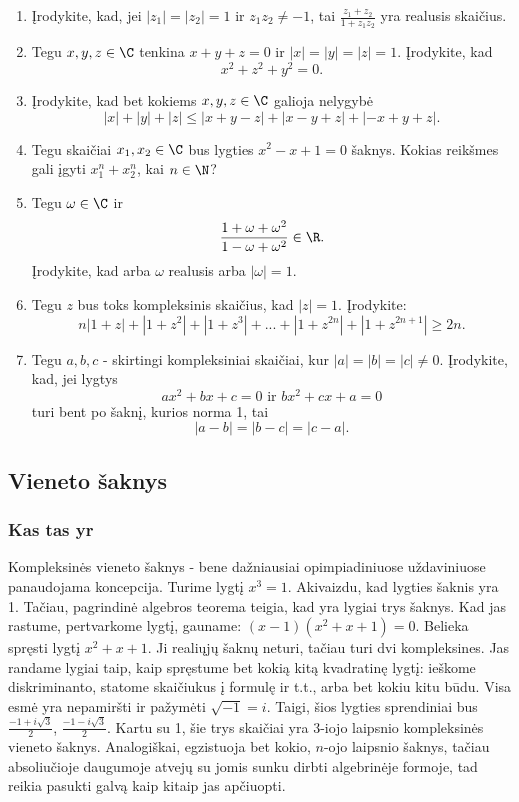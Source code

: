 \begin{enumerate}
\item Įrodykite, kad, jei $|z_1|=|z_2|=1$ ir $z_1z_2\neq -1$, tai $\frac{z_1+z_2}{1+z_1z_2}$ yra realusis skaičius.  
\item Tegu $x,y,z\in\C$ tenkina $x+y+z=0$ ir $|x|=|y|=|z|=1$. Įrodykite, kad $$x^2+z^2+y^2=0.$$
\item Įrodykite, kad bet kokiems $x,y,z\in\C$ galioja nelygybė $$|x|+|y|+|z|\leq |x+y-z|+|x-y+z|+|-x+y+z|.$$
\item Tegu skaičiai $x_1,x_2\in\C$ bus lygties $x^2-x+1=0$ šaknys. Kokias reikšmes gali įgyti $x_1^n+x_2^n$, kai $n\in\N$?
\item Tegu $\omega\in\C$ ir $$\frac{1+\omega+\omega^2}{1-\omega+\omega^2}\in\R.$$ Įrodykite, kad arba $\omega $ realusis arba $|\omega|=1.$
\item Tegu $z$ bus toks kompleksinis skaičius, kad $|z|=1$. Įrodykite: $$n|1+z|+|1+z^2|+|1+z^3|+...+|1+z^{2n}|+|1+z^{2n+1}|\geq 2n.$$
\item Tegu $a,b,c$ - skirtingi kompleksiniai skaičiai, kur $|a|=|b|=|c|\neq 0$. Įrodykite, kad, jei lygtys $$ax^2+bx+c=0 \text{ ir } bx^2+cx+a=0$$ turi bent po šaknį, kurios norma 1, tai $$|a-b|=|b-c|=|c-a|.$$
\end{enumerate}    

\subsection{Vieneto šaknys}

\subsubsection{Kas tas yr}

Kompleksinės vieneto šaknys - bene dažniausiai opimpiadiniuose uždaviniuose panaudojama koncepcija. Turime lygtį $x^3=1$. Akivaizdu, kad lygties šaknis yra 1. Tačiau, pagrindinė algebros teorema teigia, kad yra lygiai trys šaknys. Kad jas rastume, pertvarkome lygtį, gauname: $(x-1)(x^2+x+1)=0$. Belieka spręsti lygtį $x^2+x+1$. Ji realiųjų šaknų neturi, tačiau turi dvi kompleksines. Jas randame lygiai taip, kaip spręstume bet kokią kitą kvadratinę lygtį: ieškome diskriminanto, statome skaičiukus į formulę ir t.t., arba bet kokiu kitu būdu. Visa esmė yra nepamiršti ir pažymėti $\sqrt{-1}=i$. Taigi, šios lygties sprendiniai bus $\frac{-1+i\sqrt{3}}{2}$, $\frac{-1-i\sqrt{3}}{2}$. Kartu su 1, šie trys skaičiai yra 3-iojo laipsnio kompleksinės vieneto šaknys. Analogiškai, egzistuoja bet kokio, $n$-ojo laipsnio šaknys, tačiau absoliučioje daugumoje atvejų su jomis sunku dirbti algebrinėje formoje, tad reikia pasukti galvą kaip kitaip jas apčiuopti. 


